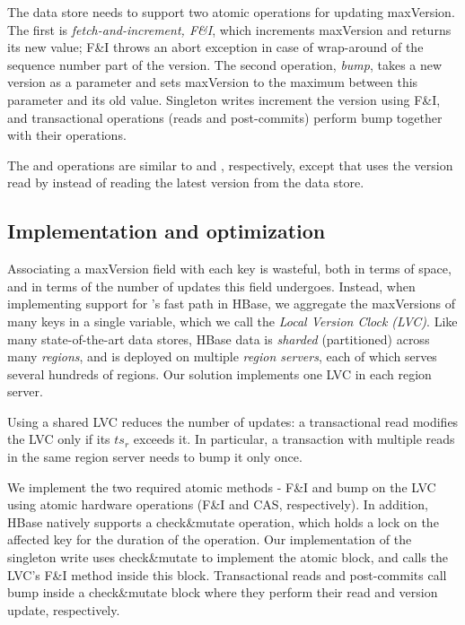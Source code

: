 The data store needs to support two atomic operations for updating {maxVersion}.
The first is \emph{fetch-and-increment, F\&I}, which increments {maxVersion} and returns its
new value; F\&I throws an abort exception in case of wrap-around of the 
sequence number part  of 
the version. The second operation, \emph{bump}, takes a new version  as a parameter and
sets  {maxVersion} to the maximum between this parameter and its old value.
Singleton writes  increment the version using F\&I, and transactional operations (reads and post-commits)
perform { bump} together with their operations. 

The  and  operations are  similar to  and , 
respectively, except that  uses the version read by  instead of 
reading the latest version from the data store.

\subsection{Implementation and optimization}
\label{ssec:fast-impl}

Associating a maxVersion field with each key is wasteful,
both in terms of space, and in terms of the number of updates this field undergoes.
Instead, when implementing support for \sys's fast path in HBase, we aggregate the maxVersions of many keys in a single variable, which we call the \emph{Local Version Clock (LVC)}.
Like many state-of-the-art data stores, HBase data is \emph{sharded} (partitioned) 
across many \emph{regions}, and is deployed on multiple  \emph{region servers}, each of which serves
several hundreds of regions. Our solution implements one LVC in each region server. 

Using a shared LVC reduces the number of updates:  
a transactional read modifies the LVC only if its $ts_r$ exceeds it. In particular, 
a transaction with multiple reads in the same region server needs to bump it only once. 

We implement the two required atomic methods - F\&I and bump on the LVC using atomic hardware operations (F\&I and CAS, respectively). 
In addition, 
HBase   natively supports  a check\&mutate operation, which holds a lock on the affected key for the duration of the operation.
Our implementation of the singleton write uses  check\&mutate to implement the atomic block, and calls the LVC's F\&I method inside this block.
Transactional reads and post-commits call bump inside a check\&mutate  block where they perform their read and version update, respectively. 


